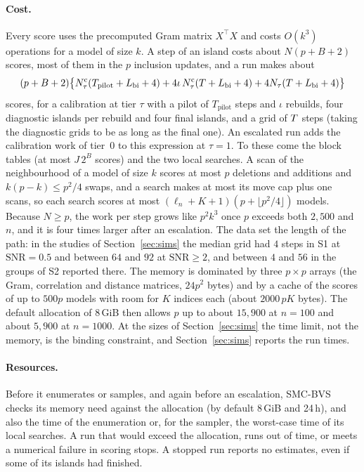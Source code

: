 \paragraph{Cost.} Every score uses the precomputed Gram matrix $X^\top X$ and costs $O(k^3)$ operations for a model of
size $k$. A step of an island costs about $N(p+B+2)$ scores, most of them in the $p$ inclusion updates, and a run
makes about
\[
  (p+B+2)\big\{N^{\mathrm c}_\tau(T_{\mathrm{pilot}}+L_{\mathrm{bi}}+4)+4\iota\,N^{\mathrm c}_\tau(T+L_{\mathrm{bi}}+4)+4N_\tau(T+L_{\mathrm{bi}}+4)\big\}
\]
scores, for a calibration at tier $\tau$ with a pilot of $T_{\mathrm{pilot}}$ steps and $\iota$ rebuilds, four
diagnostic islands per rebuild and four final islands, and a grid of $T$ steps (taking the diagnostic grids to be as
long as the final one). An escalated run adds the calibration work of tier~$0$ to this expression at $\tau=1$. To
these come the block tables (at most $J\,2^B$ scores) and the two local searches. A scan of the neighbourhood of a
model of size $k$ scores at most $p$ deletions and additions and $k(p-k)\le p^2/4$ swaps, and a search makes at most
its move cap plus one scans, so each search scores at most $(\ell_n+K+1)(p+\lfloor p^2/4\rfloor)$ models. Because
$N\ge p$, the work per step grows like $p^2k^3$ once $p$ exceeds both $2{,}500$ and $n$, and it is four times larger
after an escalation. The data set the length of the path: in the studies of Section~\ref{sec:sims} the median grid
had $4$ steps in S1 at $\mathrm{SNR}=0.5$ and between $64$ and $92$ at $\mathrm{SNR}\ge2$, and between $4$
and $56$ in the groups of S2 reported there. The memory is dominated by three $p\times p$ arrays (the Gram, correlation and
distance matrices, $24p^2$ bytes) and by a cache of the scores of up to $500p$ models with room for $K$ indices each
(about $2000\,pK$ bytes). The default allocation of 8\,GiB then allows $p$ up to about $15{,}900$ at $n=100$ and
about $5{,}900$ at $n=1000$. At the sizes of Section~\ref{sec:sims} the time limit, not the memory, is the binding
constraint, and Section~\ref{sec:sims} reports the run times.

\paragraph{Resources.} Before it enumerates or samples, and again before an escalation, SMC-BVS checks its memory
need against the allocation (by default 8\,GiB and 24\,h), and also the time of the enumeration or, for the sampler,
the worst-case time of its local searches. A run that would
exceed the allocation, runs out of time, or meets a numerical failure in scoring stops. A stopped run reports no
estimates, even if some of its islands had finished.

